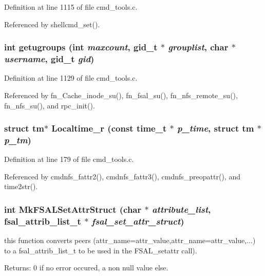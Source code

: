 Definition at line 1115 of file cmd\_\-tools.c.

Referenced by shellcmd\_\-set().
\subsubsection{\setlength{\rightskip}{0pt plus 5cm}int getugroups (int {\em maxcount}, gid\_\-t $\ast$ {\em grouplist}, char $\ast$ {\em username}, gid\_\-t {\em gid})}\label{cmd__tools_8h_a25}




Definition at line 1129 of file cmd\_\-tools.c.

Referenced by fn\_\-Cache\_\-inode\_\-su(), fn\_\-fsal\_\-su(), fn\_\-nfs\_\-remote\_\-su(), fn\_\-nfs\_\-su(), and rpc\_\-init().
\subsubsection{\setlength{\rightskip}{0pt plus 5cm}struct tm$\ast$ Localtime\_\-r (const time\_\-t $\ast$ {\em p\_\-time}, struct tm $\ast$ {\em p\_\-tm})}\label{cmd__tools_8h_a9}




Definition at line 179 of file cmd\_\-tools.c.

Referenced by cmdnfs\_\-fattr2(), cmdnfs\_\-fattr3(), cmdnfs\_\-preopattr(), and time2str().
\subsubsection{\setlength{\rightskip}{0pt plus 5cm}int Mk\-FSALSet\-Attr\-Struct (char $\ast$ {\em attribute\_\-list}, fsal\_\-attrib\_\-list\_\-t $\ast$ {\em fsal\_\-set\_\-attr\_\-struct})}\label{cmd__tools_8h_a23}


this function converts peers (attr\_\-name=attr\_\-value,attr\_\-name=attr\_\-value,...) to a fsal\_\-attrib\_\-list\_\-t to be used in the FSAL\_\-setattr call). \begin{Desc}
\item[Returns:]0 if no error occured, a non null value else. \end{Desc}


